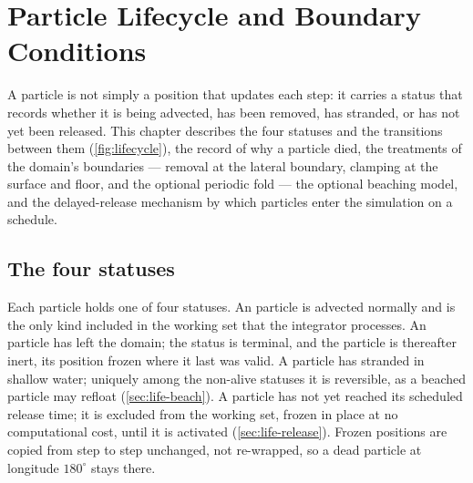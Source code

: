 \chapter{Particle Lifecycle and Boundary Conditions}\label{ch:lifecycle}

A particle is not simply a position that updates each step: it carries a status that records whether it is
being advected, has been removed, has stranded, or has not yet been released. This chapter describes the four
statuses and the transitions between them (\cref{fig:lifecycle}), the record of why a particle died, the
treatments of the domain's boundaries --- removal at the lateral boundary, clamping at the surface and floor,
and the optional periodic fold --- the optional beaching model, and the delayed-release mechanism by which
particles enter the simulation on a schedule.

\section{The four statuses}\label{sec:life-status}

Each particle holds one of four statuses. An  particle is advected normally and is the only kind
included in the working set that the integrator processes. An  particle has left the domain; the
status is terminal, and the particle is thereafter inert, its position frozen where it last was valid. A
 particle has stranded in shallow water; uniquely among the non-alive statuses it is reversible,
as a beached particle may refloat (\cref{sec:life-beach}). A  particle has not yet reached
its scheduled release time; it is excluded from the working set, frozen in place at no computational cost,
until it is activated (\cref{sec:life-release}). Frozen positions are copied from step to step unchanged, not
re-wrapped, so a dead particle at longitude $180^\circ$ stays there.

